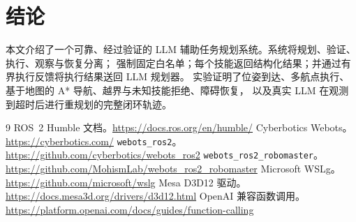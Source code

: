 \documentclass[10pt,twocolumn]{ctexart}
\begin{document}
\section{结论}
\label{sec:conclusion}
本文介绍了一个可靠、经过验证的 LLM 辅助任务规划系统。系统将规划、验证、执行、观察与恢复分离；
强制固定白名单；每个技能返回结构化结果；并通过有界执行反馈将执行结果送回 LLM 规划器。
实验证明了位姿到达、多航点执行、基于地图的 A* 导航、越界与未知技能拒绝、障碍恢复，
以及真实 LLM 在观测到超时后进行重规划的完整闭环轨迹。

\begin{thebibliography}{9}
ROS~2 Humble 文档。\url{https://docs.ros.org/en/humble/}
Cyberbotics Webots。\url{https://cyberbotics.com/}
\texttt{webots\_ros2}。\url{https://github.com/cyberbotics/webots_ros2}
\texttt{webots\_ros2\_robomaster}。
\url{https://github.com/MohismLab/webots_ros2_robomaster}
Microsoft WSLg。\url{https://github.com/microsoft/wslg}
Mesa D3D12 驱动。\url{https://docs.mesa3d.org/drivers/d3d12.html}
OpenAI 兼容函数调用。
\url{https://platform.openai.com/docs/guides/function-calling}
\end{thebibliography}
\end{document}
